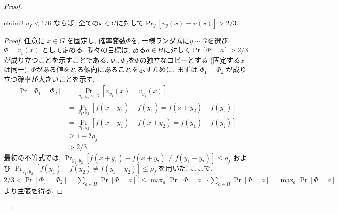 \begin{proof}
    \begin{claim}{}{claim2}
      $\rho_f<1/6$ ならば, 全ての$x\in G$に対して$\Pr_y[v_y(x)= v(x)] > 2/3$.
    \end{claim}
    \begin{proof}
      任意に $x\in G$ を固定し, 確率変数$\Phi$を, 一様ランダムに$y\sim G$を選び $\Phi=v_y(x)$ として定める. 我々の目標は, ある$a\in H$に対して$\Pr[\Phi=a]>2/3$ が成り立つことを示すことである.
      $\Phi_1,\Phi_2$を$\Phi$の独立なコピーとする (固定する$x$は同一). $\Phi$がある値をとる傾向にあることを示すために, まずは $\Phi_1=\Phi_2$ が成り立つ確率が大きいことを示す.
      \begin{align*}
      \Pr[\Phi_1 = \Phi_2] &= \Pr_{y_1,y_2\sim G}[ v_{y_1}(x) = v_{y_2}(x) ] \\
      &= \Pr_{y_1,y_2}[ f(x+y_1) - f(y_1) = f(x+y_2) - f(y_2) ] \\
      &= \Pr_{y_1,y_2}[ f(x+y_1)-f(x+y_2) = f(y_1)-f(y_2) ] \\
      &\ge 1-2\rho_f \\
      &> 2/3.
      \end{align*}    
      最初の不等式では, $\Pr_{y_1,y_2}[f(x+y_1)-f(x+y_2) \ne f(y_1-y_2)]\le \rho_f$ および $\Pr_{y_1,y_2}[f(y_1)-f(y_2)\ne f(y_1-y_2)]\le \rho_f$ を用いた.    
      ここで, $2/3<\Pr[\Phi_1=\Phi_2]=\sum_{a\in H}\Pr[\Phi=a]^2 \le \max_a\Pr[\Phi=a]\cdot \sum_{a\in H}\Pr[\Phi=a] = \max_a\Pr[\Phi=a]$ より主張を得る.
    \end{proof}


\end{proof}
